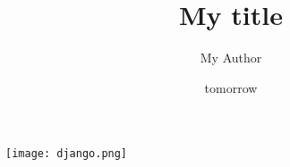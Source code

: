 \documentclass[a4paper,11pt]{report}
\title{ My title  }
\author{ My Author }
\date{ tomorrow }
\begin{document}
\maketitle


\tableofcontents
\newpage
\texttt{[image: django.png]}

\end{document}

